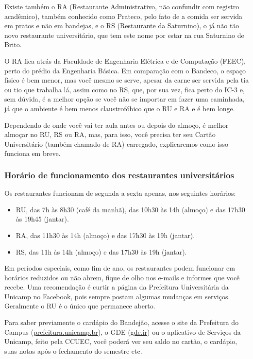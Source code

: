 Existe também o RA (Restaurante Administrativo, não confundir com registro
acadêmico), também conhecido como Prateco, pelo fato de a comida ser servida
em pratos e não em bandejas, e o RS (Restaurante da Saturnino), o já não tão
novo restaurante universitário, que tem este nome por estar na rua Saturnino de
Brito.

O RA fica atrás da Faculdade de Engenharia Elétrica e de Computação (FEEC),
perto do prédio da Engenharia Básica. Em comparação com o Bandeco, o espaço
físico é bem menor, mas você mesmo se serve, apesar da carne ser servida pela
tia ou tio que trabalha lá, assim como no RS, que, por sua vez, fica perto do
IC-3 e, sem dúvida, é a melhor opção se você não se importar em fazer uma
caminhada, já que o ambiente é bem menos claustrofóbico que o RU e RA e é bem
longe.

Dependendo de onde você vai ter aula antes ou depois do almoço, é melhor
almoçar no RU, RS ou RA, mas, para isso, você precisa ter seu Cartão
Universitário (também chamado de RA) carregado, explicaremos como isso funciona
em breve.

\subsubsection{Horário de funcionamento dos restaurantes universitários}

Os restaurantes funcionam de segunda a sexta apenas, nos seguintes horários:

\begin{itemize}
\item RU, das 7h às 8h30 (café da manhã), das 10h30 às 14h (almoço) e das 17h30
 às 19h45 (jantar).
\item RA, das 11h30 às 14h (almoço) e das 17h30 às 19h (jantar).
\item RS, das 11h às 14h (almoço) e das 17h30 às 19h (jantar).
\end{itemize}

Em períodos especiais, como fim de ano, os restaurantes podem funcionar em
horários reduzidos ou não abrem, fique de olho nos e-mails e informes que você
recebe. Uma recomendação é curtir a página da Prefeitura Universitária da
Unicamp no Facebook, pois sempre postam algumas mudanças em serviços.
Geralmente o RU é o único que permanece aberto.

Para saber previamente o cardápio do Bandejão, acesse o site da Prefeitura do
Campus (\url{prefeitura.unicamp.br}), o GDE (\url{gde.ir}) ou o aplicativo de
Serviços da Unicamp, feito pela CCUEC, você poderá ver seu saldo no cartão, o
cardápio, suas notas após o fechamento do semestre etc.

